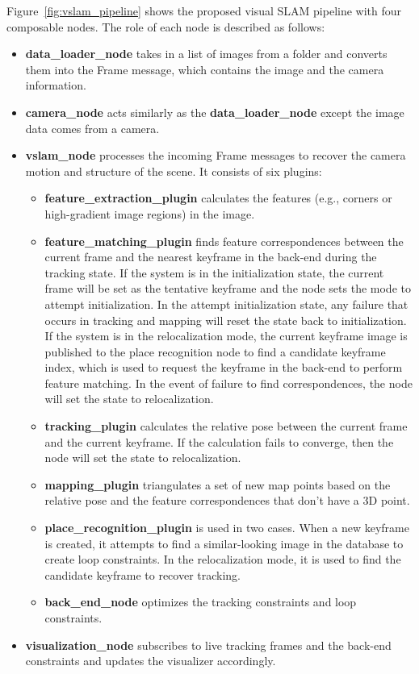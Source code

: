 Figure~\ref{fig:vslam_pipeline} shows the proposed visual SLAM pipeline with four composable nodes. 
The role of each node is described as follows:
\begin{itemize}
  \item \textbf{data\_loader\_node} takes in a list of images from a folder and converts them into the Frame message, which contains the image and the camera information.
  
  \item \textbf{camera\_node} acts similarly as the \textbf{data\_loader\_node} except the image data comes from a camera.
  
  \item \textbf{vslam\_node} processes the incoming Frame messages to recover the camera motion and structure of the scene. It consists of six plugins: 
    \begin{itemize}
      \item \textbf{feature\_extraction\_plugin} calculates the features (e.g., corners or high-gradient image regions) in the image.
      \item \textbf{feature\_matching\_plugin} finds feature correspondences between the current frame and the nearest keyframe in the back-end during the tracking state.
        If the system is in the initialization state, the current frame will be set as the tentative keyframe and the node sets the mode to attempt initialization.
        In the attempt initialization state, any failure that occurs in tracking and mapping will reset the state back to initialization.
        If the system is in the relocalization mode, the current keyframe image is published to the place recognition node to find a candidate keyframe index, which is used to request the keyframe in the back-end to perform feature matching.
        In the event of failure to find correspondences, the node will set the state to relocalization.
      \item \textbf{tracking\_plugin} calculates the relative pose between the current frame and the current keyframe. 
        If the calculation fails to converge, then the node will set the state to relocalization. 
      \item \textbf{mapping\_plugin} triangulates a set of new map points based on the relative pose and the feature correspondences that don't have a 3D point. 
      \item \textbf{place\_recognition\_plugin} is used in two cases. 
        When a new keyframe is created, it attempts to find a similar-looking image in the database to create loop constraints.
        In the relocalization mode, it is used to find the candidate keyframe to recover tracking.
      \item \textbf{back\_end\_node} optimizes the tracking constraints and loop constraints.
    \end{itemize}

  \item \textbf{visualization\_node} subscribes to live tracking frames and the back-end constraints and updates the visualizer accordingly.
\end{itemize}


